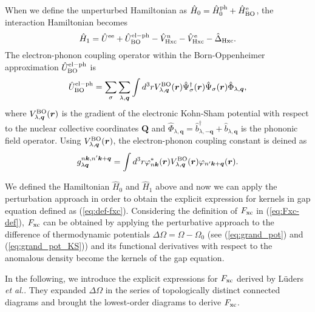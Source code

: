 When we define the unperturbed Hamiltonian as $\hat{H}_0 = \hat{H}^{\rm ph}_0 + \hat{H}^{\rm e}_{\rm BO}$,
the interaction Hamiltonian becomes
%
\begin{equation}
	\hat{H}_1 = \hat{U}^{\rm ee} + \hat{U}^{\rm el-ph}_{\rm BO} - \hat{V}^{\rm n}_{\rm Hxc}
	- \hat{V}^{\rm e}_{\rm Hxc} - \hat{\Delta}_{\rm Hxc}.
	\label{eq:int_Hamil}
\end{equation}
%
The electron-phonon coupling operator within the Born-Oppenheimer approximation
$\hat{U}^{\rm el-ph}_{\rm BO}$ is 
%
\begin{equation}
	\hat{U}^{\rm el-ph}_{\rm BO} = \sum_{\sigma} \sum_{\lambda,{\bm q}}
	\int d^3r V^{\rm BO}_{\lambda, {\bm q}}({\bm r})
	\hat{\Psi}^\dag_\sigma({\bm r}) \hat{\Psi}_\sigma({\bm r})
	\hat{\Phi}_{\lambda, {\bm q}},
	\label{eq:el-ph-coup-ope}
\end{equation}
%
where $V^{\rm BO}_{\lambda, {\bm q}}({\bm r})$ is the gradient of the electronic Kohn-Sham potential
with respect to the nuclear collective coordinates $\bm Q$ and 
$\hat{\Phi}_{\lambda, {\bm q}} = \hat{b}^\dag_{\lambda,-{\bm q}} + \hat{b}_{\lambda, {\bm q}}$ is the
phononic field operator.
Using $V^{\rm BO}_{\lambda, {\bm q}}({\bm r})$, the electron-phonon coupling constant is deined as 
%
\begin{equation}
	g^{n{\bm k},n'{\bm k}+{\bm q}}_{\lambda {\bm q}} = \int d^3r \varphi^\ast_{n{\bm k}}({\bm r})
	V^{\rm BO}_{\lambda, {\bm q}}({\bm r})\varphi_{n'{\bm k}+{\bm q}}({\bm r}).
	\label{eq:el-ph-coup-g}
\end{equation}
%

We defined the Hamiltonian $\hat{H}_0$ and $\hat{H}_1$ above and now we can apply the perturbation
approach in order to obtain the explicit expression for kernels in gap equation defined as
(\ref{eq:def-fxc}).
Considering the definition of $F_{\rm xc}$ in (\ref{eq:Fxc-def}),
$F_{\rm xc}$ can be obtained by applying the perturbative approach to the difference of 
thermodynamic potentials $\Delta\Omega = \Omega - \Omega_0$ 
(see (\ref{eq:grand_pot}) and (\ref{eq:grand_pot_KS}))
and its functional derivatives with respect to the anomalous density become the kernels of the 
gap equation.

In the following, we introduce the explicit expressions for $F_{\rm xc}$ derived by L\"{u}ders {\it et al.}.
They expanded $\Delta\Omega$ in the series of topologically distinct connected diagrams 
and brought the lowest-order diagrams to derive $F_{\rm xc}$.

